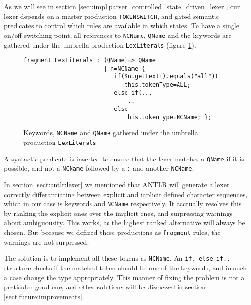 As we will see in section \ref{sect:impl:parser_controlled_state_driven_lexer}, our lexer depends on a master production \verb!TOKENSWITCH!, and gated semantic predicates to control which rules are available in which states. To have a single on/off switching point, all references to \verb!NCName!, \verb!QName! and the keywords are gathered under the umbrella production \verb!LexLiterals! (figure \ref{fig:lexLitterals}).

\begin{figure}[h!]
\begin{Verbatim}
fragment LexLiterals : (QName)=> QName
                       | n=NCName {
                          if($n.getText().equals("all")) 
                             this.tokenType=ALL;
                          else if(...
                             ...
                          else 
                             this.tokenType=NCName; };
\end{Verbatim}
\caption[Keywords, \texttt{NCName} and \texttt{QName} gathered under \texttt{LexLiterals}]{Keywords, \texttt{NCName} and \texttt{QName} gathered under the umbrella production \texttt{LexLiterals}}
\label{fig:lexLitterals}
\end{figure}

A syntactic predicate is inserted to ensure that the lexer matches a \verb!QName! if it is possible, and not a \verb!NCName! followed by a \verb!:! and another \verb!NCName!.

In section \ref{sect:antlr:lexer} we mentioned that ANTLR will generate a lexer correctly differanciating between explicit and inplicit defined character sequences, which in our case is keywords and \verb!NCName! respectively. It acctually resolves this by ranking the explicit ones over the implicit ones, and surpressing warnings about ambiguousity. This works, as the highest ranked alternative will always be chosen. But because we defined these productions as \verb!fragment! rules, the warnings are not surpressed.

The solution is to implement all these tokens as \verb!NCName!. An \verb!if..else if..! structure checks if the matched token should be one of the keywords, and in such a case change the type appropriately. This manner of fixing the problem is not a preticular good one, and other solutions will be discussed in section \ref{sect:future:improvements}.
